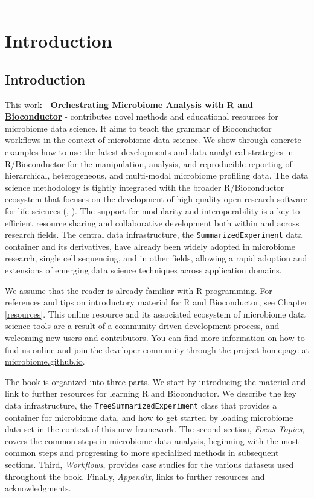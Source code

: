 \documentclass[
]{book}
\begin{document}
\begin{center}\rule{0.5\linewidth}{0.5pt}\end{center}

\hypertarget{part-introduction}{%
\part{Introduction}\label{part-introduction}}

\hypertarget{intro}{%
\chapter{Introduction}\label{intro}}

This work - \href{microbiome.github.io/OMA}{\textbf{Orchestrating Microbiome Analysis with R and
Bioconductor}} \citep{OMA} - contributes novel
methods and educational resources for microbiome data science. It
aims to teach the grammar of Bioconductor workflows in the context of
microbiome data science. We show through concrete examples how to use
the latest developments and data analytical strategies in
R/Bioconductor for the manipulation, analysis, and reproducible
reporting of hierarchical, heterogeneous, and multi-modal microbiome
profiling data. The data science methodology is tightly integrated
with the broader R/Bioconductor ecosystem that focuses on the
development of high-quality open research software for life
sciences (\citet{Gentleman2004}, \citet{Huber2015}). The support for modularity and
interoperability is a key to efficient resource sharing and
collaborative development both within and across research fields. The
central data infrastructure, the \texttt{SummarizedExperiment} data container
and its derivatives, have already been widely adopted in microbiome
research, single cell sequencing, and in other fields, allowing a
rapid adoption and extensions of emerging data science techniques
across application domains.

We assume that the reader is already familiar with R programming. For
references and tips on introductory material for R and Bioconductor,
see Chapter \ref{resources}. This online resource and its associated
ecosystem of microbiome data science tools are a result of a
community-driven development process, and welcoming new users and
contributors. You can find more information on how to find us online
and join the developer community through the project homepage at
\href{https://microbiome.github.io}{microbiome.github.io}.

The book is organized into three parts. We start by introducing the
material and link to further resources for learning R and
Bioconductor. We describe the key data infrastructure, the
\texttt{TreeSummarizedExperiment} class that provides a container for
microbiome data, and how to get started by loading microbiome data set
in the context of this new framework. The second section, \emph{Focus
Topics}, covers the common steps in microbiome data analysis,
beginning with the most common steps and progressing to more
specialized methods in subsequent sections. Third, \emph{Workflows},
provides case studies for the various datasets used throughout the
book. Finally, \emph{Appendix}, links to further resources and
acknowledgments.
\end{document}

